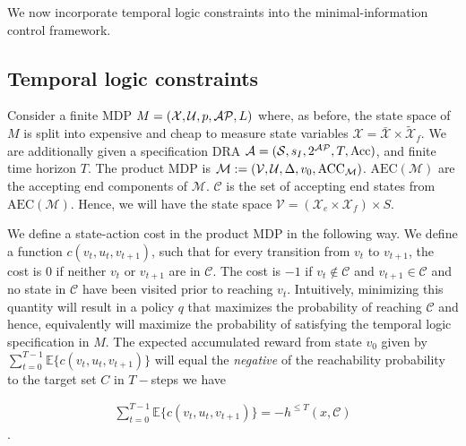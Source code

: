 We now incorporate temporal logic constraints into the minimal-information control framework.
\subsection{Temporal logic constraints}
Consider a finite MDP $M=(\mathcal{X},\mathcal{U},p,\mathcal{AP},L)$ where, as before, the state space of $M$ is split into expensive and cheap to measure state variables $\mathcal{X} = \mathcal{\bar{X}} \times \mathcal{\tilde{X}}_f$. We are additionally given a specification DRA $\mathcal{A} = (\mathcal{S},s_I,2^{\mathcal{AP}}, T,\textrm{Acc})$, and finite time horizon $T$. The product MDP is $\mathcal{M}:= (\mathcal{V},\mathcal{U}, \Delta,v_0,\textrm{ACC}_{\mathcal{M}})$. $\textrm{AEC}(\mathcal{M})$ are the accepting end components of $\mathcal{M}$. $\mathcal{C}$ is the set of accepting end states from $\textrm{AEC}(\mathcal{M})$.  Hence, we will have the state space $\mathcal{V} = (\mathcal{X}_e \times \mathcal{X}_f) \times S$. 

We define a state-action cost in the product MDP in the following way. We define a function $c(v_t,u_t,v_{t+1})$, such that for every transition from $v_t$ to $v_{t+1}$, the cost is $0$ if neither $v_t$ or $v_{t+1}$ are in $\mathcal{C}$. The cost is $-1$ if $v_t \notin \mathcal{C}$ and $v_{t+1} \in \mathcal{C}$ and no state in $\mathcal{C}$ have been visited prior to reaching $v_t$.  Intuitively, minimizing this quantity will result in a policy $q$ that maximizes the probability of reaching $\mathcal{C}$ and hence, equivalently will maximize the probability of satisfying the temporal logic specification in $M$. The expected accumulated reward from state $v_0$ given by $\sum_{t=0}^{T-1}\mathbb{E}\{c(v_t,u_t,v_{t+1})\}$ will equal the \emph{negative} of the reachability probability to the target set $C$ in $T-$steps \ie we have

\begin{align*}
\sum_{t=0}^{T-1}\mathbb{E}\{c(v_t,u_t,v_{t+1})\} = -h^{\leq T}(x,\mathcal{C})
\end{align*}.


